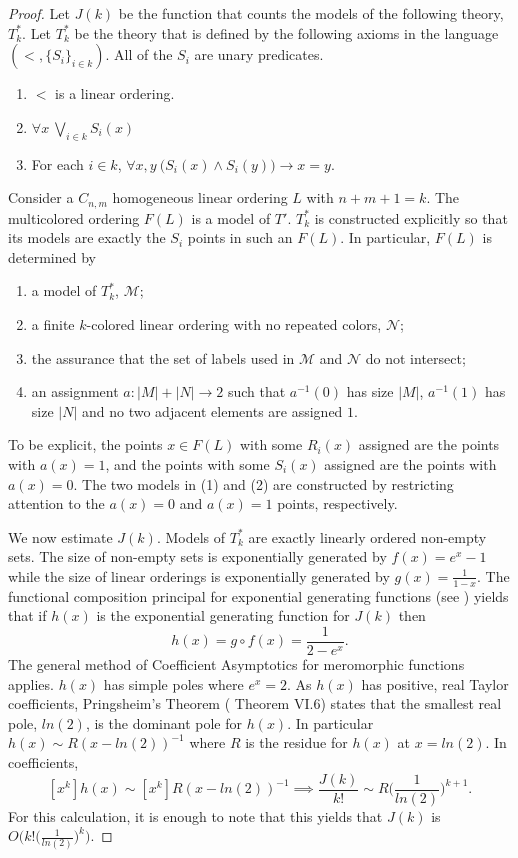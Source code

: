 \documentclass[11pt]{amsart}
\theoremstyle{definition}
\def\M{{\mathcal M}}
\def\N{{\mathcal N}}
\begin{document}
\begin{proof}
    Let $J(k)$ be the function that counts the models of the following theory, $T^*_k$.
    Let $T^*_k$ be the theory that is defined by the following axioms in the language $(<,\{S_i\}_{i\in k})$. All of the $S_i$ are unary predicates.
    \begin{enumerate}
        \item $<$ is a linear ordering.
        \item $\forall x ~ \bigvee_{i\in k} S_i(x)$
        \item For each $i\in k$, $\forall x,y ~ \big(S_i(x)\land S_i(y)\big)\to x=y$.
    \end{enumerate}
    Consider a $C_{n,m}$ homogeneous linear ordering $L$ with $n+m+1=k$.
    The multicolored ordering $F(L)$ is a model of $T'$.
    $T^*_k$ is constructed explicitly so that its models are exactly the $S_i$ points in such an $F(L)$.
    In particular, $F(L)$ is determined by
    \begin{enumerate}
        \item a model of $T^*_k$, $\M$;
        \item a finite $k$-colored linear ordering with no repeated colors, $\N$;
        \item the assurance that the set of labels used in $\M$ and $\N$ do not intersect;
        \item an assignment $a:|M|+|N|\to 2$ such that $a^{-1}(0)$ has size $|M|$, $a^{-1}(1)$ has size $|N|$ and no two adjacent elements are assigned $1$.
    \end{enumerate} 
    To be explicit, the points $x\in F(L)$ with some $R_i(x)$ assigned are the points with $a(x)=1$, and the points with some $S_i(x)$ assigned are the points with $a(x)=0$.
    The two models in (1) and (2) are constructed by restricting attention to the $a(x)=0$ and $a(x)=1$ points, respectively.

    We now estimate $J(k)$.
    Models of $T^*_k$ are exactly linearly ordered non-empty sets.
    The size of non-empty sets is exponentially generated by $f(x)=e^x-1$ while the size of linear orderings is exponentially generated by $g(x)=\frac1{1-x}$.
    The functional composition principal for exponential generating functions (see \cite[Chapter 2]{AnCom}) yields that if $h(x)$ is the exponential generating function for $J(k)$ then
    \[h(x)=g\circ f(x)=\frac{1}{2-e^x}.\]
    The general method of Coefficient Asymptotics for meromorphic functions applies.
    $h(x)$ has simple poles where $e^x=2$.
    As $h(x)$ has positive, real Taylor coefficients, Pringsheim's Theorem (\cite{AnCom} Theorem VI.6) states that the smallest real pole, $ln(2)$, is the dominant pole for $h(x)$.
    In particular $h(x)\sim R(x-ln(2))^{-1}$ where $R$ is the residue for $h(x)$ at $x=ln(2)$.
    In coefficients,
    \[[x^k]h(x)\sim[x^k]R(x-ln(2))^{-1} \implies \frac{J(k)}{k!}\sim R\Big(\frac1{ln(2)}\Big)^{k+1}.\]
    For this calculation, it is enough to note that this yields that $J(k)$ is $O\Big(k!\big(\frac1{ln(2)}\big)^k\Big)$.


\end{proof}
\end{document}
